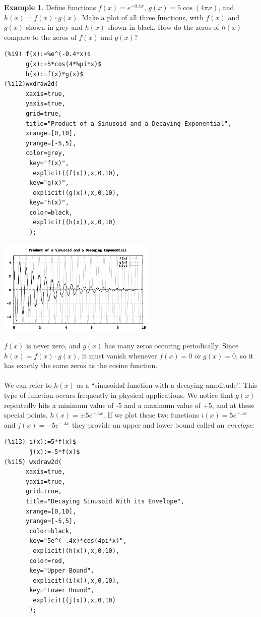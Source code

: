 \documentclass[10.5pt,twoside]{report}
\theoremstyle{definition}
\newtheorem{exmp}{Example}[section]
\begin{document}
\begin{exmp}

Define functions $f(x)=e^{-0.4x}$, $g(x)=5\cos{(4 \pi x)}$, and $h(x)=f(x)\cdot g(x)$. Make a plot of all three functions, with $f(x)$ and $g(x)$ shown in grey and $h(x)$ shown in black.  How do the zeros of $h(x)$ compare to the zeros of $f(x)$ and $g(x)$?  \\ 

\begin{verbatim}
(%i9) f(x):=%e^(-0.4*x)$
      g(x):=5*cos(4*%pi*x)$
      h(x):=f(x)*g(x)$
(%i12)wxdraw2d(
      xaxis=true,
      yaxis=true,
      grid=true,
      title="Product of a Sinusoid and a Decaying Exponential",
      xrange=[0,10],
      yrange=[-5,5],
      color=grey,
       key="f(x)",
        explicit((f(x)),x,0,10),
       key="g(x)",
        explicit((g(x)),x,0,10),
       key="h(x)",
       color=black,
        explicit((h(x)),x,0,10)
       );
\end{verbatim}

\includegraphics[width=3in]{example_2_2_3_1}

$f(x)$ is never zero, and $g(x)$ has many zeros occuring periodically.  Since $h(x)=f(x)\cdot g(x)$, it must vanish whenever $f(x)=0$ or $g(x)=0$, so it has exactly the same zeros as the cosine function.\\
${}$\\

We can refer to $h(x)$ as a ``sinusoidal function with a decaying amplitude''.  This type of function occurs frequently in physical applications. We notice that $g(x)$ repeatedly hits a minimum value of -5 and a maximum value of +5, and at these special points, $h(x)=\pm 5e^{-.4x}$.  If we plot these two functions $i(x)=5e^{-.4x}$ and $j(x)=-5e^{-.4x}$ they provide an upper and lower bound called an \textit{envelope}:

\begin{verbatim}
(%i13) i(x):=5*f(x)$
       j(x):=-5*f(x)$
(%i15) wxdraw2d(
      xaxis=true,
      yaxis=true,
      grid=true,
      title="Decaying Sinusoid With its Envelope",
      xrange=[0,10],
      yrange=[-5,5],
       color=black,
       key="5e^(-.4x)*cos(4pi*x)",
        explicit((h(x)),x,0,10),
       color=red, 
       key="Upper Bound",
        explicit((i(x)),x,0,10),
       key="Lower Bound",
        explicit((j(x)),x,0,10)
       );
\end{verbatim}


\end{exmp}
\end{document}
